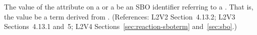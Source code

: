 The value of the  attribute on a \SpeciesReference or a
\ModifierSpeciesReference {} be an SBO identifier referring to a
.  That is, the value  be a term derived
from \sboparticipantrole.     (References: 
L2V2 Section~4.13.2; L2V3 Sections~4.13.1 and~5; L2V4 Sections~\ref{sec:reaction-sboterm} and~\ref{sec:sbo}.)
